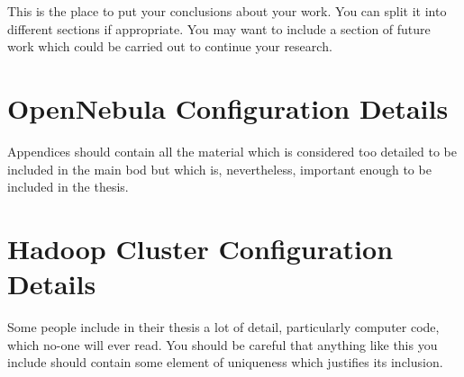 \documentclass[12pt,a4paper]{report}
\begin{document}
This is the place to put your conclusions about your work. You can
split it into different sections if appropriate. You may want to include
a section of future work which could be carried out to continue your
research.

\appendix

\chapter{OpenNebula Configuration Details}

Appendices should contain all the material which is considered too
detailed to be included in the main bod but which is, nevertheless,
important enough to be included in the thesis. 

\chapter{Hadoop Cluster Configuration Details}

Some  people include in their \cite{fox2009above}thesis a lot of detail, particularly
computer code, which no-one will ever read. You should be careful that
anything like this you include \cite{website:aws} should contain some element
 of \cite{weinman2011future}uniqueness which justifies its inclusion.





\end{document}
